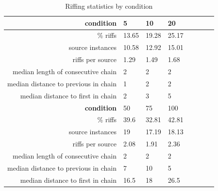 


\begin{table}
\begin{tabular}[h!]{r | l l l l l l l}
    \hline \hline \textbf{condition} & 5 & 10 & 20  \\ \hline \hline
    \% riffs & 13.65 & 19.28 & 25.17  \\
    source instances & 10.58 & 12.92 & 15.01 \\
    riffs per source & 1.29 & 1.49 & 1.68 \\
    median length of consecutive chain & 2 & 2 & 2 \\
    median distance to previous in chain & 1 & 2 & 2 \\
    median distance to first in chain & 2 & 3 & 5 \\ \hline \hline
    \textbf{condition} & 50 & 75 & 100 \\ \hline \hline
    \% riffs & 39.6 & 32.81 & 42.81 \\
    source instances & 19 & 17.19 & 18.13\\
    riffs per source & 2.08 & 1.91 & 2.36\\
    median length of consecutive chain & 2 & 2 & 2\\
    median distance to previous in chain & 7 & 10 & 5\\
    median distance to first in chain & 16.5 & 18 & 26.5 \\
    \end{tabular}
    \caption{Riffing statistics by condition}
    \label{tab:riffing}
\end{table}


